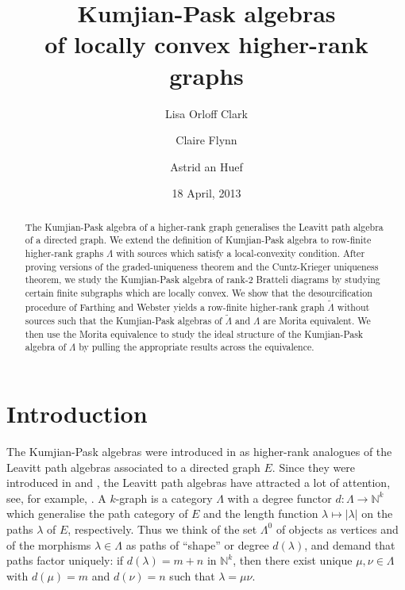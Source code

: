 \documentclass[a4paper,12pt]{amsart}
\title[Kumjian-Pask algebras of locally convex higher-rank graphs]{Kumjian-Pask algebras \\ of locally convex higher-rank graphs}
\author{Lisa Orloff Clark}
\author{Claire Flynn}
\author{Astrid an Huef}
\date{18 April, 2013}
\numberwithin{equation}{section}
\theoremstyle{definition}
\theoremstyle{remark}
\begin{document}
\begin{abstract} 
\end{abstract}



\begin{abstract}  The Kumjian-Pask algebra of a higher-rank graph generalises the Leavitt path algebra of a directed 
graph.  We extend the definition of Kumjian-Pask algebra to row-finite higher-rank graphs $\Lambda$ with sources which satisfy a 
local-convexity condition. After proving  versions of the graded-uniqueness theorem and the Cuntz-Krieger uniqueness theorem,
we study the Kumjian-Pask algebra of rank-$2$ Bratteli diagrams by studying certain finite subgraphs which are locally convex. 
 We show that the desourcification procedure of Farthing and Webster yields a  row-finite higher-rank graph ${\tilde{\Lambda}}$  without sources
 such that the Kumjian-Pask algebras of ${\tilde{\Lambda}}$ and $\Lambda$ are Morita equivalent.  We then use the Morita equivalence to study 
the ideal structure of the Kumjian-Pask algebra of $\Lambda$  by pulling the appropriate results across the equivalence.
\end{abstract}

\maketitle

\section{Introduction}
The Kumjian-Pask algebras were introduced in \cite{ACaHR} as higher-rank analogues of
the Leavitt path algebras associated to a directed graph $E$. Since they were introduced in \cite{AA1} and \cite{AMP}, 
the Leavitt path algebras have attracted a lot of attention,  see, for example, \cite{AA2, AA3, AB, AG, AGP, G, GR, Smith, T1, T}.  
A $k$-graph is a category $\Lambda$ with a degree functor $d:\Lambda\to{\mathbb{N}}^k$ which generalise the path category of $E$ and the 
length function $\lambda\mapsto|\lambda|$ on the paths $\lambda$ of $E$, respectively. Thus we think of the set $\Lambda^0$ of 
objects as vertices and of the morphisms  $\lambda\in\Lambda$ as paths of ``shape'' or degree $d(\lambda)$, and demand that paths 
factor uniquely: if $d(\lambda)=m+n$ in ${\mathbb{N}}^k$, then there exist unique $\mu,\nu\in\Lambda$ with $d(\mu)=m$ and $d(\nu)=n$ such 
that $\lambda=\mu\nu$.
\end{document}
